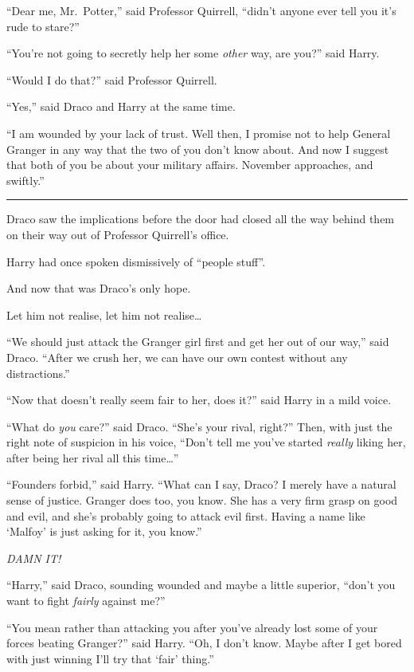 ``Dear me, Mr.~Potter,'' said Professor Quirrell, ``didn't anyone ever
tell you it's rude to stare?''

``You're not going to secretly help her some \emph{other} way, are
you?'' said Harry.

``Would I do that?'' said Professor Quirrell.

``Yes,'' said Draco and Harry at the same time.

``I am wounded by your lack of trust. Well then, I promise not to help
General Granger in any way that the two of you don't know about. And now
I suggest that both of you be about your military affairs. November
approaches, and swiftly.''

\begin{center}\rule{3in}{0.4pt}\end{center}

Draco saw the implications before the door had closed all the way behind
them on their way out of Professor Quirrell's office.

Harry had once spoken dismissively of ``people stuff''.

And now that was Draco's only hope.

Let him not realise, let him not realise\ldots{}

``We should just attack the Granger girl first and get her out of our
way,'' said Draco. ``After we crush her, we can have our own contest
without any distractions.''

``Now that doesn't really seem fair to her, does it?'' said Harry in a
mild voice.

``What do \emph{you} care?'' said Draco. ``She's your rival, right?''
Then, with just the right note of suspicion in his voice, ``Don't tell
me you've started \emph{really} liking her, after being her rival all
this time\ldots{}''

``Founders forbid,'' said Harry. ``What can I say, Draco? I merely have
a natural sense of justice. Granger does too, you know. She has a very
firm grasp on good and evil, and she's probably going to attack evil
first. Having a name like `Malfoy' is just asking for it, you know.''

\emph{DAMN IT!}

``Harry,'' said Draco, sounding wounded and maybe a little superior,
``don't you want to fight \emph{fairly} against me?''

``You mean rather than attacking you after you've already lost some of
your forces beating Granger?'' said Harry. ``Oh, I don't know. Maybe
after I get bored with just winning I'll try that `fair' thing.''

